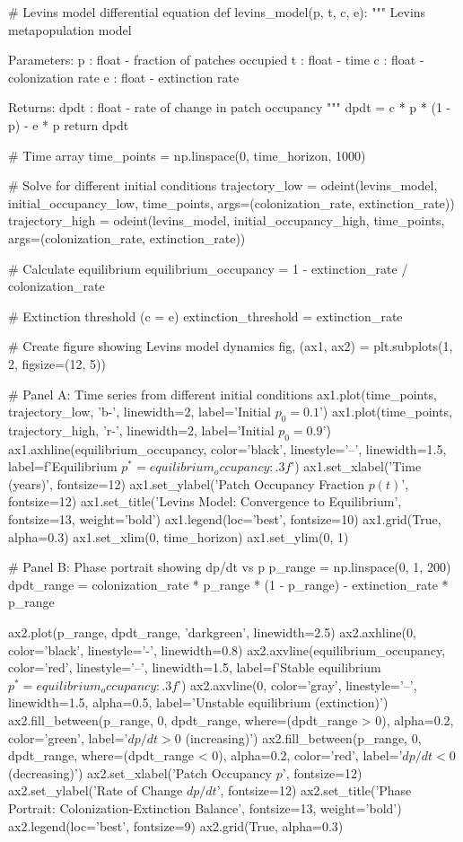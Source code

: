 \documentclass[11pt,a4paper]{article}
\begin{document}
\begin{pycode}
# Levins model differential equation
def levins_model(p, t, c, e):
    """
    Levins metapopulation model

    Parameters:
    p : float - fraction of patches occupied
    t : float - time
    c : float - colonization rate
    e : float - extinction rate

    Returns:
    dpdt : float - rate of change in patch occupancy
    """
    dpdt = c * p * (1 - p) - e * p
    return dpdt

# Time array
time_points = np.linspace(0, time_horizon, 1000)

# Solve for different initial conditions
trajectory_low = odeint(levins_model, initial_occupancy_low, time_points,
                       args=(colonization_rate, extinction_rate))
trajectory_high = odeint(levins_model, initial_occupancy_high, time_points,
                        args=(colonization_rate, extinction_rate))

# Calculate equilibrium
equilibrium_occupancy = 1 - extinction_rate / colonization_rate

# Extinction threshold (c = e)
extinction_threshold = extinction_rate

# Create figure showing Levins model dynamics
fig, (ax1, ax2) = plt.subplots(1, 2, figsize=(12, 5))

# Panel A: Time series from different initial conditions
ax1.plot(time_points, trajectory_low, 'b-', linewidth=2, label='Initial $p_0 = 0.1$')
ax1.plot(time_points, trajectory_high, 'r-', linewidth=2, label='Initial $p_0 = 0.9$')
ax1.axhline(equilibrium_occupancy, color='black', linestyle='--', linewidth=1.5,
           label=f'Equilibrium $p^* = {equilibrium_occupancy:.3f}$')
ax1.set_xlabel('Time (years)', fontsize=12)
ax1.set_ylabel('Patch Occupancy Fraction $p(t)$', fontsize=12)
ax1.set_title('Levins Model: Convergence to Equilibrium', fontsize=13, weight='bold')
ax1.legend(loc='best', fontsize=10)
ax1.grid(True, alpha=0.3)
ax1.set_xlim(0, time_horizon)
ax1.set_ylim(0, 1)

# Panel B: Phase portrait showing dp/dt vs p
p_range = np.linspace(0, 1, 200)
dpdt_range = colonization_rate * p_range * (1 - p_range) - extinction_rate * p_range

ax2.plot(p_range, dpdt_range, 'darkgreen', linewidth=2.5)
ax2.axhline(0, color='black', linestyle='-', linewidth=0.8)
ax2.axvline(equilibrium_occupancy, color='red', linestyle='--', linewidth=1.5,
           label=f'Stable equilibrium $p^* = {equilibrium_occupancy:.3f}$')
ax2.axvline(0, color='gray', linestyle='--', linewidth=1.5, alpha=0.5,
           label='Unstable equilibrium (extinction)')
ax2.fill_between(p_range, 0, dpdt_range, where=(dpdt_range > 0),
                alpha=0.2, color='green', label='$dp/dt > 0$ (increasing)')
ax2.fill_between(p_range, 0, dpdt_range, where=(dpdt_range < 0),
                alpha=0.2, color='red', label='$dp/dt < 0$ (decreasing)')
ax2.set_xlabel('Patch Occupancy $p$', fontsize=12)
ax2.set_ylabel('Rate of Change $dp/dt$', fontsize=12)
ax2.set_title('Phase Portrait: Colonization-Extinction Balance', fontsize=13, weight='bold')
ax2.legend(loc='best', fontsize=9)
ax2.grid(True, alpha=0.3)


\end{pycode}
\end{document}
